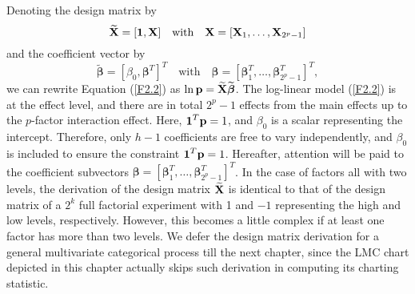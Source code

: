 Denoting the design matrix by
\[
\widetilde{{\bf X}}=[\boldsymbol{1},{\bf X}]\quad\mathrm{with}\quad{\bf X}=[{\bf
X}_1,\ldots,{\bf X}_{2^p-1}]
\]
and the coefficient vector by
\[
\widetilde{\bm{\beta}}=[\beta_0,\bm{\beta}^T]^T\quad\mathrm{with}\quad
\bm\beta=[\bm{\beta}_1^T,\ldots,\bm{\beta}_{2^p-1}^T]^T,
\]
we can rewrite Equation
(\ref{F2.2}) as $\ln {\bf p}=\widetilde{{\bf X}}\widetilde{\boldsymbol{\beta}}$. The
log-linear model (\ref{F2.2}) is at the effect level, and there are in total $2^p-1$
effects from the main effects up to the $p$-factor interaction effect. Here,
$\boldsymbol1^T{\bf p}=1$, and $\beta_0$ is a scalar representing the intercept. Therefore,
only $h-1$ coefficients are free to vary independently, and $\beta_0$ is included to
ensure the constraint $\boldsymbol1^T{\bf p}=1$. Hereafter, attention will be paid to the
coefficient subvectors $\bm\beta=[\bm{\beta}_1^T,\ldots,\bm{\beta}_{2^p-1}^T]^T$. In
the case of factors all with two levels, the derivation of the design matrix
$\widetilde{{\bf X}}$ is identical to that of the design matrix of a $2^k$ full
factorial experiment with 1 and $-1$ representing the high and low levels,
respectively. However, this becomes a little complex if at least one factor has more
than two levels. We defer the design matrix derivation for a general multivariate
categorical process till the next chapter, since the LMC chart depicted in this
chapter actually skips such derivation in computing its charting statistic.

